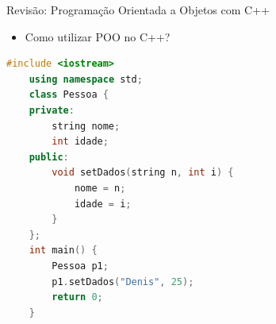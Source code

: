 \begin{frame}[fragile]{Revisão: Programação Orientada a Objetos com C++}
    \begin{itemize}
        \item Como utilizar POO no C++?
    \end{itemize}

\begin{lstlisting}[language=C++,basicstyle=\ttfamily\scriptsize]
    #include <iostream>
    using namespace std;
    class Pessoa {
    private:
        string nome;
        int idade;
    public:
        void setDados(string n, int i) {
            nome = n;
            idade = i;
        }
    };
    int main() {
        Pessoa p1;
        p1.setDados("Denis", 25);
        return 0;
    }
\end{lstlisting}
\end{frame}